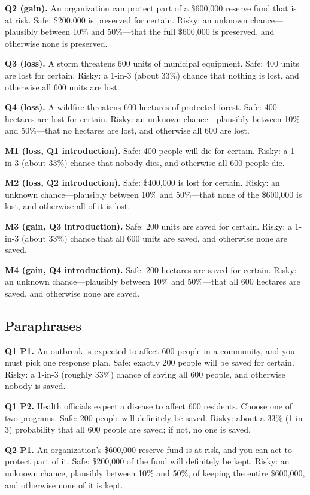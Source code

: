\documentclass[11pt]{article}
\begin{document}
\textbf{Q2 (gain).} An organization can protect part of a \$600,000 reserve fund that is at risk. Safe: \$200,000 is preserved for certain. Risky: an unknown chance---plausibly between 10\% and 50\%---that the full \$600,000 is preserved, and otherwise none is preserved.

\textbf{Q3 (loss).} A storm threatens 600 units of municipal equipment. Safe: 400 units are lost for certain. Risky: a 1-in-3 (about 33\%) chance that nothing is lost, and otherwise all 600 units are lost.

\textbf{Q4 (loss).} A wildfire threatens 600 hectares of protected forest. Safe: 400 hectares are lost for certain. Risky: an unknown chance---plausibly between 10\% and 50\%---that no hectares are lost, and otherwise all 600 are lost.

\textbf{M1 (loss, Q1 introduction).} Safe: 400 people will die for certain. Risky: a 1-in-3 (about 33\%) chance that nobody dies, and otherwise all 600 people die.

\textbf{M2 (loss, Q2 introduction).} Safe: \$400,000 is lost for certain. Risky: an unknown chance---plausibly between 10\% and 50\%---that none of the \$600,000 is lost, and otherwise all of it is lost.

\textbf{M3 (gain, Q3 introduction).} Safe: 200 units are saved for certain. Risky: a 1-in-3 (about 33\%) chance that all 600 units are saved, and otherwise none are saved.

\textbf{M4 (gain, Q4 introduction).} Safe: 200 hectares are saved for certain. Risky: an unknown chance---plausibly between 10\% and 50\%---that all 600 hectares are saved, and otherwise none are saved.

\subsection{Paraphrases}

\textbf{Q1 P1.} An outbreak is expected to affect 600 people in a community, and you must pick one response plan. Safe: exactly 200 people will be saved for certain. Risky: a 1-in-3 (roughly 33\%) chance of saving all 600 people, and otherwise nobody is saved.

\textbf{Q1 P2.} Health officials expect a disease to affect 600 residents. Choose one of two programs. Safe: 200 people will definitely be saved. Risky: about a 33\% (1-in-3) probability that all 600 people are saved; if not, no one is saved.

\textbf{Q2 P1.} An organization's \$600,000 reserve fund is at risk, and you can act to protect part of it. Safe: \$200,000 of the fund will definitely be kept. Risky: an unknown chance, plausibly between 10\% and 50\%, of keeping the entire \$600,000, and otherwise none of it is kept.
\end{document}
